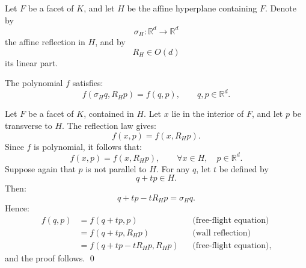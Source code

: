 \documentclass[12pt,reqno]{amsart}
\makeatletter
\renewenvironment{proof}[1][\proofname]{%
  \par\vspace{\topsep}%
  \normalfont\topsep6\p@\@plus6\p@\relax
  \trivlist
  \item[\hskip\labelsep\itshape #1\@addpunct{.}]\ignorespaces
}{%
  \endtrivlist
}
\numberwithin{equation}{section}
\def \R {\mathbb{R}}
\makeatother
\begin{document}
Let \(F\) be a facet of \(K\), and let \(H\) be the affine hyperplane
containing \(F\). Denote by
\[
\sigma_H:\R^d\to\R^d
\]
the affine reflection in \(H\), and by
\[
R_H\in O(d)
\]
its linear part.
\begin{lemma}\label{lem:reflection}
The polynomial \(f\) satisfies:
\[
f(\sigma_H q, R_H p) = f(q,p),
\qquad q,p\in\R^d.
\]
\end{lemma}
\begin{proof}
Let \(F\) be a facet of \(K\), contained in \(H\). Let \(x\) lie in the interior of \(F\), and let 
\(p\) be transverse to \(H\). 
The reflection law gives:
\[
f(x,p)=f(x,R_Hp).
\]
Since \(f\) is polynomial, it follows that:
\[
f(x,p)=f(x,R_Hp),
\qquad \forall x\in H,\quad p\in\R^d.
\]
Suppose again that \(p\) is not parallel to \(H\). For any \(q\), let \(t\) be defined by
\[
q + t p \in H.
\]
Then:
\[
q + tp - t R_H p = \sigma_H q.
\]
Hence:
\[
\begin{aligned}
f(q,p)
&=f(q+tp,p)
&&\text{(free-flight equation)}\\
&=f(q+t p, R_H p)
&&\text{(wall reflection)}\\
&=f(q + tp - t R_H p, R_Hp)
&&\text{(free-flight equation),}
\end{aligned}
\tag{2}\label{eq}
\]
and the proof follows. \qed
\end{proof}
\end{document}
